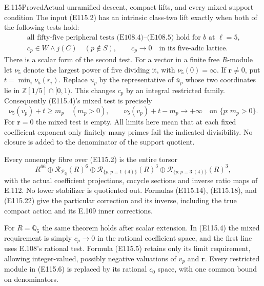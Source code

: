 \begin{statement}{E.115}{Proved}{Actual unramified descent, compact lifts, and every mixed support condition}
The input (E115.2) has an intrinsic class-two lift exactly when
both of the following tests hold:
\[
 \begin{gathered}
 \text{all fifty-five peripheral tests (E108.4)--(E108.5)
       hold for $b$ at $\ell=5$,}\\
 c_p\in W\wedge j(C)\quad(p\notin S),\qquad
 c_p\longrightarrow0\quad\text{in its five-adic lattice.}
 \end{gathered}
 \tag{E115.4}
\]
There is a scalar form of the second test.  For a vector in
a finite free $R$-module let $\nu_5$ denote the largest power
of five dividing it, with $\nu_5(0)=\infty$.
If $\mathbf r\ne0$, put $t=\min_i\nu_5(r_i)$.
Replace $u_p$ by the representative of $\overline u_p$ whose
two coordinates lie in $\mathbb Z[1/5]\cap[0,1)$.
This changes $c_p$ by an integral restricted family.
Consequently (E115.4)'s mixed test is precisely
\[
 \nu_5(v_p)+t\ge m_p\quad(m_p>0),\qquad
 \nu_5(v_p)+t-m_p\longrightarrow+\infty
                         \quad\text{on $\{p:m_p>0\}$.}
 \tag{E115.5}
\]
For $\mathbf r=0$ the mixed test is empty.
All limits here mean that at each fixed coefficient exponent
only finitely many primes fail the indicated divisibility.
No closure is added to the denominator of the support quotient.

Every nonempty fibre over (E115.2) is the entire torsor
\[
 R^{66}\oplus\mathcal R_{\mathcal P_{\mathbb Q}}(R)^6
 \oplus\mathcal R_{\{p:p\equiv1\ (4)\}}(R)^3
 \oplus\mathcal R_{\{p:p\equiv3\ (4)\}}(R)^3,
 \tag{E115.6}
\]
with the actual coefficient projections, cocycle sections and
inverse ratio maps of E.112.  No lower stabilizer is quotiented
out.  Formulas (E115.14), (E115.18), and (E115.22) give the
particular correction and its inverse, including the true
compact action and its E.109 inner corrections.

For $R=\mathbb Q_5$ the same theorem holds after scalar
extension.  In (E115.4) the mixed requirement is simply
$c_p\to0$ in the rational coefficient space, and the first
line uses E.108's rational test.
Formula (E115.5) retains only its limit requirement, allowing
integer-valued, possibly negative valuations of $v_p$ and
$\mathbf r$.
Every restricted module in (E115.6) is replaced by its rational
$c_0$ space, with one common bound on denominators.


\end{statement}
